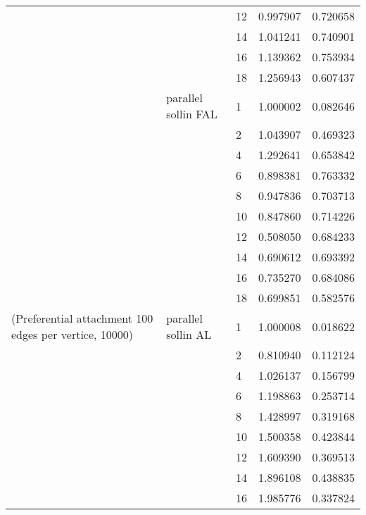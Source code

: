 \begin{tabular}{lllrr}
                      &                     & 12 &  0.997907 &  0.720658 \\
                      &                     & 14 &  1.041241 &  0.740901 \\
                      &                     & 16 &  1.139362 &  0.753934 \\
                      &                     & 18 &  1.256943 &  0.607437 \\
                      & parallel sollin FAL & 1  &  1.000002 &  0.082646 \\
                      &                     & 2  &  1.043907 &  0.469323 \\
                      &                     & 4  &  1.292641 &  0.653842 \\
                      &                     & 6  &  0.898381 &  0.763332 \\
                      &                     & 8  &  0.947836 &  0.703713 \\
                      &                     & 10 &  0.847860 &  0.714226 \\
                      &                     & 12 &  0.508050 &  0.684233 \\
                      &                     & 14 &  0.690612 &  0.693392 \\
                      &                     & 16 &  0.735270 &  0.684086 \\
                      &                     & 18 &  0.699851 &  0.582576 \\
(Preferential attachment 100 edges per vertice, 10000) & parallel sollin AL & 1  &  1.000008 &  0.018622 \\
                      &                     & 2  &  0.810940 &  0.112124 \\
                      &                     & 4  &  1.026137 &  0.156799 \\
                      &                     & 6  &  1.198863 &  0.253714 \\
                      &                     & 8  &  1.428997 &  0.319168 \\
                      &                     & 10 &  1.500358 &  0.423844 \\
                      &                     & 12 &  1.609390 &  0.369513 \\
                      &                     & 14 &  1.896108 &  0.438835 \\
                      &                     & 16 &  1.985776 &  0.337824 \\

\end{tabular}
